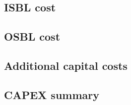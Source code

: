 \subsection{ISBL cost}
\subsection{OSBL cost}
\subsection{Additional capital costs}
\subsection{CAPEX summary}